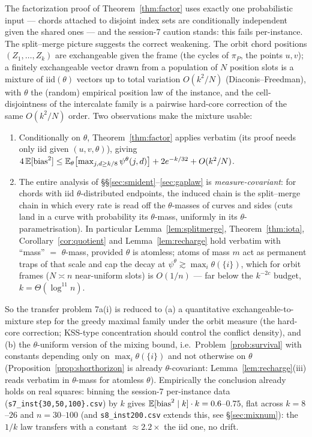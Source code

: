 The factorization proof of Theorem~\ref{thm:factor} uses exactly one
probabilistic input --- chords attached to disjoint index sets are
conditionally independent given the shared ones --- and the session-7
caution stands: this fails per-instance.  The split--merge picture
suggests the correct weakening.  The orbit chord positions
$(Z_1,\dots,Z_k)$ are exchangeable given the frame (the cycles of
$\pi_P$, the points $u,v$); a finitely exchangeable vector drawn from
a population of $N$ position slots is a mixture of iid$(\theta)$
vectors up to total variation $O(k^2/N)$ (Diaconis--Freedman), with
$\theta$ the (random) empirical position law of the instance, and the
cell-disjointness of the intercalate family is a pairwise hard-core
correction of the same $O(k^2/N)$ order.  Two observations make the
mixture usable:
\begin{enumerate}[leftmargin=2em]
\item Conditionally on $\theta$, Theorem~\ref{thm:factor} applies
verbatim (its proof needs only iid given $(u,v,\theta)$), giving
$4\,\mathbb{E}[\mathrm{bias}^2]\le
\mathbb{E}_\theta\bigl[\max_{j,d\ge k/8}\psi^\theta(j,d)\bigr]
+2e^{-k/32}+O(k^2/N)$.
\item The entire analysis of
\S\S\ref{sec:smident}--\ref{sec:gaplaw} is \emph{measure-covariant}:
for chords with iid $\theta$-distributed endpoints, the induced chain
is the split--merge chain in which every rate is read off the
$\theta$-masses of curves and sides (cuts land in a curve with
probability its $\theta$-mass, uniformly in its
$\theta$-parametrisation).  In particular Lemma~\ref{lem:splitmerge},
Theorem~\ref{thm:iota}, Corollary~\ref{cor:quotient} and
Lemma~\ref{lem:recharge} hold verbatim with ``mass'' $=$
$\theta$-mass, provided $\theta$ is atomless; atoms of mass $m$ act
as permanent traps of that scale and cap the decay at
$\psi^\theta\gtrsim\max_i\theta(\{i\})$, which for orbit frames
($N\asymp n$ near-uniform slots) is $O(1/n)$ --- far below the
$k^{-2c}$ budget, $k=\Theta(\log^{11}n)$.
\end{enumerate}
So the transfer problem 7a(i) is reduced to (a) a quantitative
exchangeable-to-mixture step for the greedy maximal family under the
orbit measure (the hard-core correction; KSS-type concentration
should control the conflict density), and (b) the
$\theta$-uniform version of the mixing bound, i.e.\
Problem~\ref{prob:survival} with constants depending only on
$\max_i\theta(\{i\})$ and not otherwise on $\theta$
(Proposition~\ref{prop:shorthorizon} is already $\theta$-covariant:
Lemma~\ref{lem:recharge}(iii) reads verbatim in $\theta$-mass for
atomless $\theta$).  Empirically the conclusion already holds on real squares:
binning the session-7 per-instance data
(\texttt{s7\_inst\{30,50,100\}.csv}) by $k$ gives
$\mathbb{E}[\mathrm{bias}^2\mid k]\cdot k=0.6$--$0.75$, flat across
$k=8$--$26$ and $n=30$--$100$ (and \texttt{s8\_inst200.csv} extends
this, see \S\ref{sec:mixnum}): the $1/k$ law transfers with a
constant $\approx2.2\times$ the iid one, no drift.

